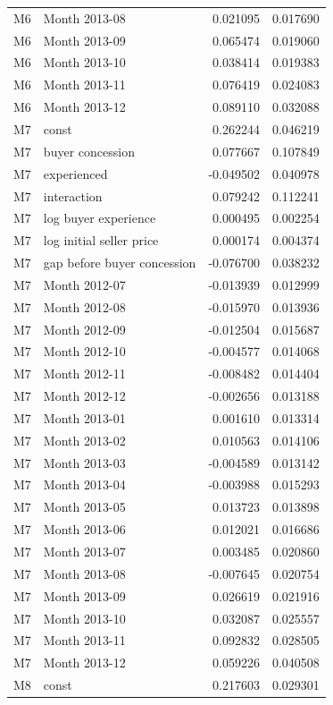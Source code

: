 \documentclass[11pt,a4paper]{article}
\begin{document}
\begin{longtable}{lp{8.4cm}rr}
M6 & Month 2013-08 & 0.021095 & 0.017690 \\
M6 & Month 2013-09 & 0.065474 & 0.019060 \\
M6 & Month 2013-10 & 0.038414 & 0.019383 \\
M6 & Month 2013-11 & 0.076419 & 0.024083 \\
M6 & Month 2013-12 & 0.089110 & 0.032088 \\
M7 & const & 0.262244 & 0.046219 \\
M7 & buyer concession & 0.077667 & 0.107849 \\
M7 & experienced & -0.049502 & 0.040978 \\
M7 & interaction & 0.079242 & 0.112241 \\
M7 & log buyer experience & 0.000495 & 0.002254 \\
M7 & log initial seller price & 0.000174 & 0.004374 \\
M7 & gap before buyer concession & -0.076700 & 0.038232 \\
M7 & Month 2012-07 & -0.013939 & 0.012999 \\
M7 & Month 2012-08 & -0.015970 & 0.013936 \\
M7 & Month 2012-09 & -0.012504 & 0.015687 \\
M7 & Month 2012-10 & -0.004577 & 0.014068 \\
M7 & Month 2012-11 & -0.008482 & 0.014404 \\
M7 & Month 2012-12 & -0.002656 & 0.013188 \\
M7 & Month 2013-01 & 0.001610 & 0.013314 \\
M7 & Month 2013-02 & 0.010563 & 0.014106 \\
M7 & Month 2013-03 & -0.004589 & 0.013142 \\
M7 & Month 2013-04 & -0.003988 & 0.015293 \\
M7 & Month 2013-05 & 0.013723 & 0.013898 \\
M7 & Month 2013-06 & 0.012021 & 0.016686 \\
M7 & Month 2013-07 & 0.003485 & 0.020860 \\
M7 & Month 2013-08 & -0.007645 & 0.020754 \\
M7 & Month 2013-09 & 0.026619 & 0.021916 \\
M7 & Month 2013-10 & 0.032087 & 0.025557 \\
M7 & Month 2013-11 & 0.092832 & 0.028505 \\
M7 & Month 2013-12 & 0.059226 & 0.040508 \\
M8 & const & 0.217603 & 0.029301 \\

\end{longtable}
\end{document}
